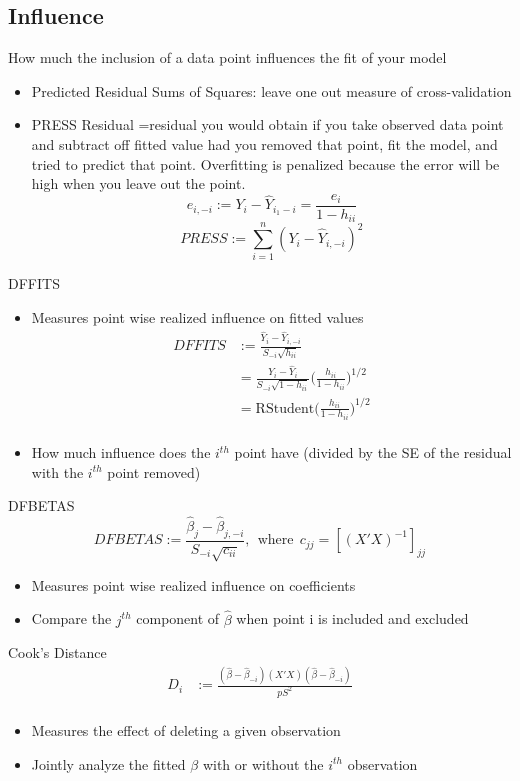 \documentclass[12pt]{article}\usepackage{graphicx, color}
\theoremstyle{definition}
\renewcommand{\hat}{\widehat}
\begin{document}
\subsection{Influence}
How much the inclusion of a data point influences the fit of your model
\begin{itemize}
\item Predicted Residual Sums of Squares: leave one out measure of cross-validation
\item PRESS Residual =residual you would obtain if you take observed data point and subtract off fitted value had you removed that point, fit the model, and tried to predict that point. Overfitting is penalized because the error will be high when you leave out the point.
$$e_{i,-i}:=Y_i-\hat Y_{i_1-i}=\frac{e_i}{1-h_{ii}}$$
$$PRESS:=\sum_{i=1}^n(Y_i-\hat Y_{i,-i})^2$$
\end{itemize} 
DFFITS
\begin{itemize}
\item Measures point wise realized influence on fitted values
\begin{align*}DFFITS&:=\frac{\hat Y_i-\hat Y_{i,-i}}{S_{-i}\sqrt{h_{ii}}}\\
&=\frac{Y_i-\hat Y_{i}}{S_{-i}\sqrt{1-h_{ii}}}\big(\frac{h_{ii}}{1-h_{ii}}\big)^{1/2}\\
&=\text{RStudent}\big(\frac{h_{ii}}{1-h_{ii}}\big)^{1/2}\\
\end{align*}
\item How much influence does the $i^{th}$ point have (divided by the SE of the residual with the $i^{th}$ point removed)
\end{itemize}
DFBETAS
$$DFBETAS:=\frac{\hat \beta_j-\hat \beta_{j,-i}}{S_{-i}\sqrt{c_{ii}}},~~\text{where}~~c_{jj}=[(X'X)^{-1}]_{jj}$$
\begin{itemize}
\item Measures point wise realized influence on coefficients
\item Compare the $j^{th}$ component of $\hat \beta$ when point i is included and excluded 
\end{itemize}
Cook's Distance
\begin{align*}D_{i}&:=\frac{(\hat \beta-\hat \beta_{-i})(X'X)(\hat \beta-\hat \beta_{-i})}{pS^2}\\
\end{align*}
\begin{itemize}
\item Measures the effect of deleting a given observation
\item Jointly analyze the fitted $\beta$ with or without the $i^{th}$ observation
\end{itemize}
\end{document}
